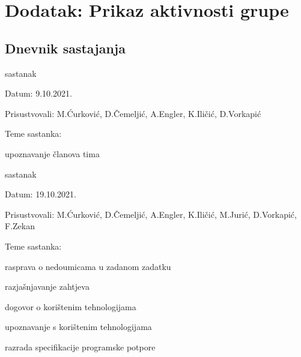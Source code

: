 \chapter*{Dodatak: Prikaz aktivnosti grupe}
		
		\section*{Dnevnik sastajanja}

		\begin{packed_enum}
			\item  sastanak
			
			\item[] \begin{packed_item}
				\item Datum: 9.10.2021.
				\item Prisustvovali: M.Ćurković, D.Čemeljić, A.Engler, K.Iličić, D.Vorkapić
				\item Teme sastanka:
				\begin{packed_item}
					\item  upoznavanje članova tima
				\end{packed_item}
			\end{packed_item}
		
		
			
			\item  sastanak
			\item[] \begin{packed_item}
				\item Datum: 19.10.2021.
				\item Prisustvovali: M.Ćurković, D.Čemeljić, A.Engler, K.Iličić, M.Jurić, D.Vorkapić, F.Zekan
				\item Teme sastanka:
				\begin{packed_item}
					\item  rasprava o nedoumicama u zadanom zadatku
					\item  razjašnjavanje zahtjeva
					\item  dogovor o korištenim tehnologijama
					\item  upoznavanje s korištenim tehnologijama
					\item  razrada specifikacije programske potpore
				\end{packed_item}
			\end{packed_item}
		
		
		

\end{packed_enum}

